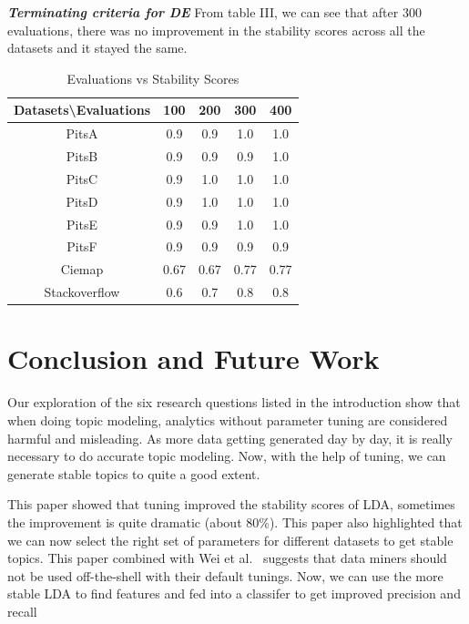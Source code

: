 \documentclass[conference]{IEEEtran}
\theoremstyle{break}
\begin{document}
\textit{\textbf{Terminating criteria for DE}} From table III, we can see that after 300 evaluations, there was no improvement in the stability scores across all the datasets and it stayed the same.

\begin{table}[H]
\begin{center}
\begin{tabular}{|c|c|c|c|c|}
\hline 
\textbf{Datasets\textbackslash Evaluations} & \textbf{100} & \textbf{200} & \textbf{300} & \textbf{400} \\[0.5ex]
\hline
PitsA & 0.9 & 0.9 & 1.0 & 1.0\\ [0.5ex]
\hline
PitsB & 0.9 & 0.9 & 0.9 & 1.0 \\ [0.5ex]
\hline
PitsC & 0.9 & 1.0 & 1.0 & 1.0\\ [0.5ex]
\hline
PitsD & 0.9 & 1.0 & 1.0 & 1.0\\ [0.5ex]
\hline
PitsE & 0.9 & 0.9 & 1.0 & 1.0\\[0.5ex]
\hline
PitsF & 0.9 & 0.9 & 0.9 & 0.9\\[0.5ex]
\hline
Ciemap & 0.67 & 0.67 & 0.77 & 0.77\\[0.5ex]
\hline
Stackoverflow & 0.6 & 0.7 & 0.8 & 0.8\\[0.5ex]
\hline
\end{tabular}
\end{center}
\caption{Evaluations vs Stability Scores}
\label{tb:tablename1}
\end{table}

\section{Conclusion and Future Work}

Our exploration of the six research questions listed in the introduction show that when doing topic modeling, analytics without parameter tuning are considered harmful and misleading. As more data getting generated day by day, it is really necessary to do accurate topic modeling. Now, with the help of tuning, we can generate stable topics to quite a good extent.

This paper showed that tuning improved the stability scores of LDA, sometimes the improvement is quite dramatic (about 80\%). This paper also highlighted that we can now select the right set of parameters for different datasets to get stable topics. This paper combined with Wei et al.~\cite{fu2016tuning} suggests that data miners should not be used off-the-shell with their default tunings. Now, we can use the more stable LDA to find features and fed into a classifer to get improved precision and recall~\cite{chen2016topic,restificar2012inferring}
\end{document}
